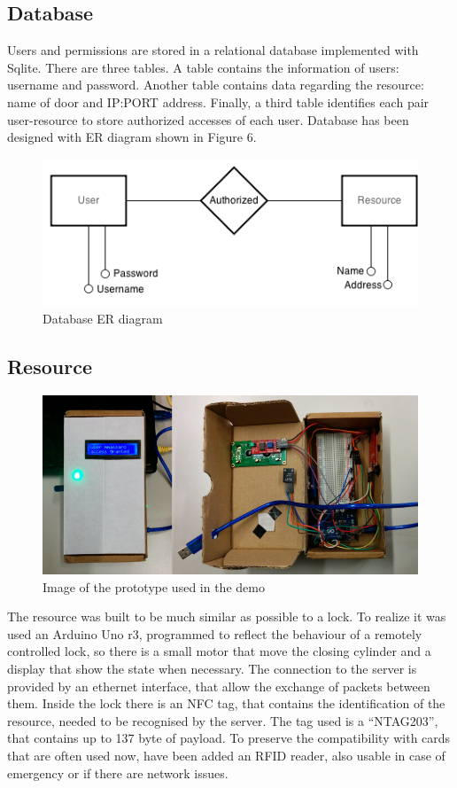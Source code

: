 \documentclass[conference]{IEEEtran}
\begin{document}
\subsection{Database}

Users and permissions are stored in a relational database implemented with Sqlite. There are three tables. A table contains the information of users: username and password. Another table contains data regarding the resource: name of door and IP:PORT address.
Finally, a third table identifies each pair user-resource to store authorized accesses of each user.
Database has been designed with ER diagram shown in Figure 6.

\begin{figure}[h]
\centering
\includegraphics[scale=0.5]{fig6}
\caption{Database ER diagram}
\label{db_ER}
\end{figure}

\subsection{Resource}

\begin{figure}[h]
\centering
\includegraphics[scale=0.3]{resource}
\caption{Image of the prototype used in the demo}
\label{resource}
\end{figure}

The resource was built to be much similar as possible to a lock. To realize it was used an Arduino Uno r3, programmed to reflect the behaviour of a remotely controlled lock, so there is a small motor that move the closing cylinder and a display that show the state when necessary.
The connection to the server is provided by an ethernet interface, that allow the exchange of packets between them. 
Inside the lock there is an NFC tag, that contains the identification of the resource, needed to be recognised by the server. The tag used is a ``NTAG203'', that contains up to 137 byte of payload.
To preserve the compatibility with cards that are often used now, have been added an RFID reader, also usable in case of emergency or if there are network issues.
\end{document}
